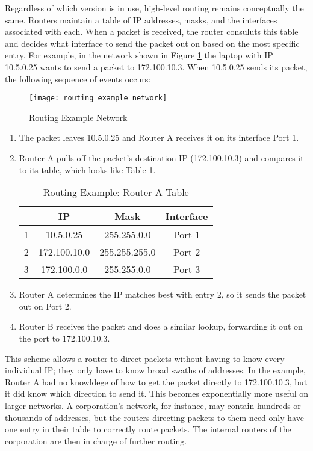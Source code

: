 \par Regardless of which version is in use, high-level routing remains conceptually the same. Routers maintain a table of \ac{IP} addresses, masks, and the interfaces associated with each. When a packet is received, the router consuluts this table and decides what interface to send the packet out on based on the most specific entry. For example, in the network shown in Figure \ref{fig:routing_example_network} the laptop with \ac{IP} 10.5.0.25 wants to send a packet to 172.100.10.3. When 10.5.0.25 sends its packet, the following sequence of events occurs:

\begin{figure}
\caption{Routing Example Network}
\label{fig:routing_example_network}
\centering
\texttt{[image: routing\_example\_network]}
\end{figure}

\begin{enumerate}[1.]
\item The packet leaves 10.5.0.25 and Router A receives it on its interface Port 1.
\item Router A pulls off the packet's destination \ac{IP} (172.100.10.3) and compares it to its table, which looks like Table \ref{tbl:routing_example_routera_table}.
	\begin{table}[h]
	\caption{Routing Example: Router A Table}
	\label{tbl:routing_example_routera_table}
	\centering
	\begin{tabular}{r|c|c|c}
	 & \ac{IP} & Mask & Interface\\
	\hline
	1 & 10.5.0.25 & 255.255.0.0 & Port 1\\
	2 & 172.100.10.0 & 255.255.255.0 & Port 2\\
	3 & 172.100.0.0 & 255.255.0.0 & Port 3\\
	\end{tabular}
	\end{table}
\item Router A determines the \ac{IP} matches best with entry 2, so it sends the packet out on Port 2.
\item Router B receives the packet and does a similar lookup, forwarding it out on the port to 172.100.10.3.
\end{enumerate}

\par This scheme allows a router to direct packets without having to know every individual IP; they only have to know broad swaths of addresses. In the example, Router A had no knowldege of how to get the packet directly to 172.100.10.3, but it did know which direction to send it. This becomes exponentially more useful on larger networks. A corporation's network, for instance, may contain hundreds or thousands of addresses, but the routers directing packets to them need only have one entry in their table to correctly route packets. The internal routers of the corporation are then in charge of further routing.

